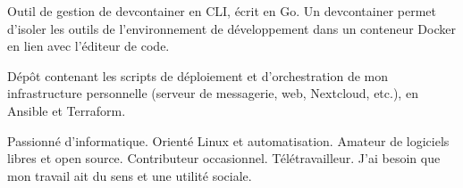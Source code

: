 \documentclass[10pt,a4paper,ragged2e,withhyper]{altacv}
\begin{document}
\begin{paracol}{2}
Outil de gestion de devcontainer en CLI, écrit en Go. Un devcontainer permet d'isoler les outils de l'environnement de développement dans un conteneur Docker en lien avec l'éditeur de code.

Dépôt contenant les scripts de déploiement et d'orchestration de mon infrastructure personnelle (serveur de messagerie, web, Nextcloud, etc.), en Ansible et Terraform.

\medskip

\switchcolumn


Passionné d'informatique. Orienté Linux et automatisation. Amateur de logiciels libres et open source. Contributeur occasionnel. Télétravailleur. J'ai besoin que mon travail ait du sens et une utilité sociale.



\medskip









\end{paracol}
\end{document}
